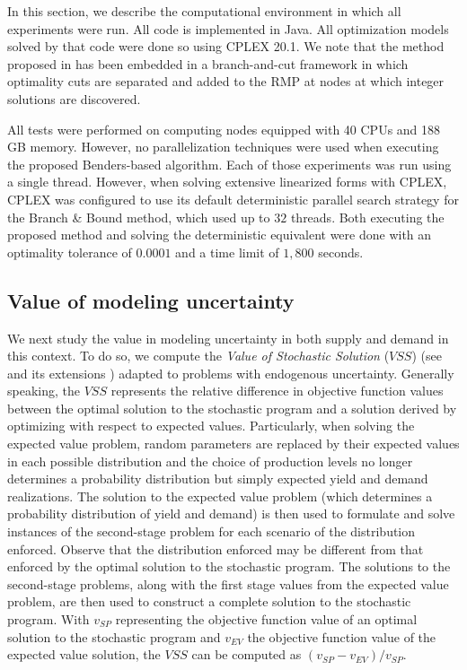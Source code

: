 \documentclass[12pt]{article}
\theoremstyle{thmstylethree}%
\begin{document}
In this section, we describe the computational environment in which all experiments were run. All code is implemented in Java. All optimization models solved by that code were done so using CPLEX 20.1. We note that the method proposed in  has been embedded in a branch-and-cut framework in which optimality cuts are separated and added to the RMP at nodes at which integer solutions are discovered. 


All tests were performed on computing nodes equipped with 40 CPUs and 188 GB memory. However, no parallelization techniques were used when executing the proposed Benders-based algorithm. Each of those experiments was run using a single thread. However, when solving extensive linearized forms with CPLEX, CPLEX was configured to use its default deterministic parallel search strategy for the Branch \& Bound method, which used up to $32$ threads. Both executing the proposed method and solving the deterministic equivalent were done with an optimality tolerance of $0.0001$ and a time limit of $1,800$ seconds. 


\subsection{Value of modeling uncertainty}
\label{subsec:value_uncertain}
We next study the value in modeling uncertainty in both supply and demand in this context. To do so, we compute the \textit{Value of Stochastic Solution} ($VSS$) (see \cite{Bir82} and its extensions \cite{EscGMP07,MagW12,PanB20}) adapted to problems with endogenous uncertainty. Generally speaking, the $VSS$ represents the relative difference in objective function values between the optimal solution to the stochastic program and a solution derived by optimizing with respect to expected values. Particularly, when solving the expected value problem, random parameters are replaced by their expected values in each possible distribution and the choice of production levels no longer determines a probability distribution but simply expected yield and demand realizations. The solution to the expected value problem (which determines a probability distribution of yield and demand) is then used to formulate and solve instances of the second-stage problem for each scenario of the distribution enforced. Observe that the distribution enforced may be different from that enforced by the optimal solution to the stochastic program. The solutions to the second-stage problems, along with the first stage values from the expected value problem, are then used to construct a complete solution to the stochastic program. With $v_{SP}$ representing the objective function value of an optimal solution to the stochastic program and $v_{EV}$ the objective function value of the expected value solution, the $VSS$ can be computed as $(v_{SP} - v_{EV})/v_{SP}.$
\end{document}
